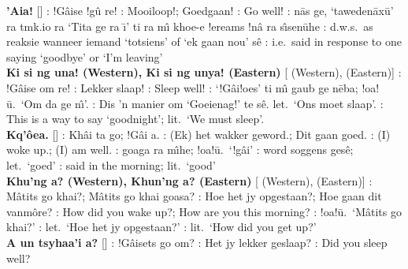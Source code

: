 \textbf{\textdoublevertline{}'Aia!}
[]
: !G\^{a}ise !g\^{u} re! : Mooiloop!;
Goedgaan! : Go well! :
\textdoublevertline{}n\={a}s ge,
`tawede\textdoublevertline{}n\={a}x\={u}' ra tmk.io ra `Tita ge ra
\={\i}' ti ra m\^{\i} khoe-e !ereams !n\^{a} ra s\^{\i}sen\={u}he
: d.w.s.\ as reaksie wanneer iemand `totsiens' of `ek
gaan nou' s\^{e} : i.e.\ said in response to one saying
`goodbye' or `I'm leaving' \\

\textbf{Ki si ng una! (Western), Ki si ng unya! (Eastern)}
[ (Western),  (Eastern)] : !G\^{a}ise
\textdoublevertline{}om re! : Lekker slaap!
: Sleep well! : `!G\^{a}i!oes' ti m\^{\i}
\textvertline{}gaub ge n\={e}ba; !oa!\={u}.\ `\textdoublevertline{}Om
da ge n\^{\i}'. : Dis 'n manier om `Goeienag!' te
s\^{e}. let.\ `Ons moet slaap'. : This is a way to say
`goodnight'; lit.\ `We must sleep'. \\

\textbf{Kq'\^{o}ea.} []
: \textdoublebarpipe{}Kh\^{a}i ta go; !G\^{a}i a.
: (Ek) het wakker geword.; Dit gaan goed.
: (I) woke up.; (I) am well. :
\textdoublevertline{}goaga ra m\^{\i}he; !oa!\={u}.\ `!g\^{a}i'
: word soggens ges\^{e}; let.\ `goed' :
said in the morning; lit.\ `good' \\

\textbf{Khu\textdoublevertline{}'ng a? (Western),
Khun\textdoublevertline{}'ng a? (Eastern)}
[ (Western),  (Eastern)] : M\^{a}tits go \textdoublebarpipe{}khai?;
M\^{a}tits go \textdoublebarpipe{}khai \textdoublevertline{}goasa?
: Hoe het jy opgestaan?; Hoe gaan dit vanm\^{o}re?
: How did you wake up?; How are you this morning?
: !oa!\={u}.\ `M\^{a}tits go \textdoublebarpipe{}khai?'
: let.\ `Hoe het jy opgestaan?' : lit.\
`How did you get up?' \\

\textbf{\textvertline{}A un tsyhaa'i a? }
[] :
!G\^{a}isets go \textdoublevertline{}om? \underbar{Afr}: Het jy lekker
geslaap? \underbar{Eng}: Did you sleep well? \\

